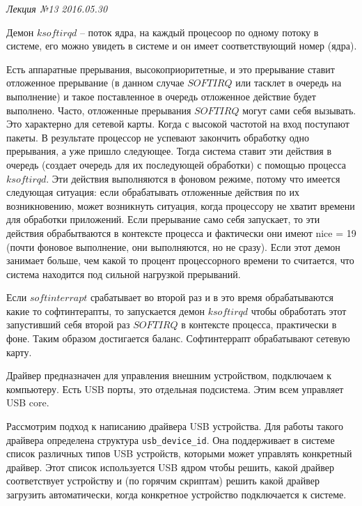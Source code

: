 \clearpage
\begin{flushright}
	\textit{Лекция №13}
	\textit{2016.05.30}
\end{flushright}

Демон $ksoftirqd$ – поток ядра, на каждый процесоор по одному потоку в системе, его можно увидеть в системе и он имеет соответствующий номер (ядра).

Есть аппаратные прерывания, высокоприоритетные, и это прерывание ставит отложенное прерывание (в данном случае $SOFTIRQ$ или $тасклет$ в очередь на выполнение) и такое поставленное в очередь отложенное действие будет выполнено. Часто, отложенные прерывания $SOFTIRQ$ могут сами себя вызывать. Это характерно для сетевой карты. Когда с высокой частотой на вход поступают пакеты. В результате процессор не успевают закончить обработку одно прерывания, а уже пришло следующее. Тогда система ставит эти действия в очередь (создает очередь для их последующей обработки) с помощью процесса $ksoftirqd$. Эти действия выполняются в фоновом режиме, потому что имеется следующая ситуация: если обрабатывать отложенные действия по их возникновению, может возникнуть ситуация, когда процессору не хватит времени для обработки приложений. Если прерывание само себя запускает, то эти действия обрабытваются в контексте процесса и фактически они имеют nice = 19 (почти фоновое выполнение, они выполняются, но не сразу). Если этот демон занимает больше, чем какой то процент процессорного времени то считается, что система находится под сильной нагрузкой прерываний.

Если $softinterrapt$   срабатывает во второй раз и в это время обрабатываются какие то софтинтерапты, то запускается демон $ksoftirqd$  чтобы обработать этот запустивший себя второй раз $SOFTIRQ$ в контексте процесса, практически в фоне. Таким образом достигается баланс. Софтинтеррапт обрабатывают сетевую карту. 

Драйвер предназначен для управления внешним устройством, подключаем к компьютеру. Есть USB порты, это отдельная подсистема. Этим всем управляет USB core.  

Рассмотрим подход к написанию драйвера USB устройства. Для работы такого драйвера определена структура \verb|usb_device_id|. Она поддерживает в системе список различных типов USB устройств, которыми может управлять конкретный драйвер.  Этот список используется USB ядром чтобы решить, какой драйвер соответствует устройству и (по горячим скриптам) решить какой драйвер загрузить автоматически, когда конкретное устройство подключается к системе. 

